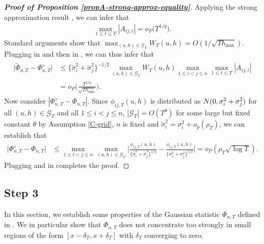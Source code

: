 \documentclass[a4paper,12pt]{article}
\makeatletter
\renewcommand{\eqref}[1]{\tagform@{\ref{#1}}}
\makeatother
\begin{document}
\begin{proof}[\textnormal{\textbf{Proof of Proposition \ref{propA-strong-approx-equality}}}]
Applying the strong approximation result \eqref{eq-strongapprox-dep}, we can infer that
\begin{align}\label{max_At}
\max_{1 \le t \le T} |A_{ij, t}|  =o_P\big(T^{1/q}\big). 
\end{align}
Standard arguments show that $\max_{(u,h) \in \mathcal{G}_T} W_T(u,h) = O( 1/\sqrt{Th_{\min}} )$. Plugging \eqref{max_At} in \eqref{eq-strongapprox-bound3} and then in \eqref{eq-strongapprox-bound2}, we can thus infer that 
\begin{align}\label{eq-strongapprox-bound4}
\begin{split}
\big| \widetilde{\Phi}_{n, T} - \Phi_{n, T}^{\diamond} \big| &\le \{\widetilde{\sigma}_i^2 + \widetilde{\sigma}_j^2 \}^{-1/2}  \max_{(u,h) \in \mathcal{G}_T} W_T(u, h) \max_{1\le i < j \le n}\max_{1\le t \le T} |A_{ij, t}|\\
&= o_P\Big( \frac{T^{1/q}}{\sqrt{Th_{\min}}} \Big).
\end{split}
\end{align}
Now consider $|\Phi_{n, T}^{\diamond} - \Phi_{n, T}|$. Since $\phi_{ij, T}(u,h)$ is distributed as $ N(0,{\sigma}^2_i + {\sigma}^2_j)$ for all $(u,h) \in \mathcal{G}_T$ and all $1\le i < j \le n$, $|\mathcal{G}_T| = O(T^\theta)$ for some large but fixed constant $\theta$ by Assumption \ref{C-grid}, $n$ is fixed and $\widetilde{\sigma}^2_i = \sigma^2_i + o_p(\rho_T)$, we can establish that
\begin{align}\label{eq-strongapprox-bound5}
\big| \Phi_{n, T}^{\diamond} - \Phi_{n, T} \big| &\le \max_{1\leq i< j \leq n}\max_{(u,h) \in \mathcal{G}_T} \Big|\frac{\phi_{ij, T}(u,h)}{\{\widetilde{\sigma}_i^2 + \widetilde{\sigma}_j^2 \}^{1/2}} - \frac{\phi_{ij, T}(u,h)}{\{{\sigma}_i^2 + {\sigma}_j^2 \}^{1/2}}\Big| = o_P(\rho_T \sqrt{\log T}).
\end{align}
Plugging \eqref{eq-strongapprox-bound4} and \eqref{eq-strongapprox-bound5} in \eqref{eq-strongapprox-bound1} completes the proof.
\end{proof}




\subsection*{Step 3}


In this section, we establish some properties of the Gaussian statistic $\Phi_{n,T}$ defined in \eqref{eq-stat-5}. We in particular show that $\Phi_{n,T}$ does not concentrate too strongly in small regions of the form $[x-\delta_T,x+\delta_T]$ with $\delta_T$ converging to zero.  
\end{document}
